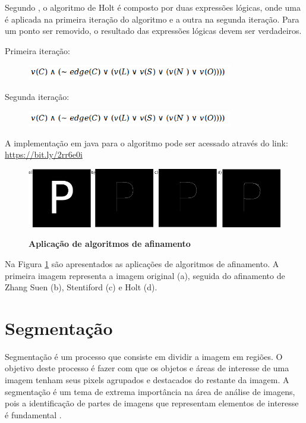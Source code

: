 \documentclass[
	12pt,				%
	oneside,			%
	a4paper,			%
	english,			%
	french,				%
	spanish,			%
	brazil,				%
	]{abntex2}
\begin{document}
Segundo \citet{guilherme:2007}, o algoritmo de Holt é composto por duas expressões lógicas, onde uma é aplicada na primeira iteração do algoritmo e a outra na segunda iteração. Para um ponto ser removido, o resultado das expressões lógicas devem ser verdadeiros.

Primeira iteração: 
\begin{figure}[ht]
\centering
\includegraphics[width=0.8\textwidth]{imagens/holt_formula1.png}
\end{figure}

Segunda iteração:
\begin{figure}[ht]
\centering
\includegraphics[width=0.8\textwidth]{imagens/holt_formula1.png}
\end{figure}

A implementação em java para o algoritmo pode ser acessado através do link: \url{https://bit.ly/2rr6e0i} 

\begin{figure}[ht]
\centering
\caption{\textbf{Aplicação de algoritmos de afinamento}}
\includegraphics[width=1\textwidth]{imagens/esqueletizacao.png}
\sourceAuthor
\label{fig:esqueletizacao}
\end{figure}

Na Figura \ref{fig:esqueletizacao} são apresentados as aplicações de algoritmos de afinamento. A primeira imagem representa a imagem original (a), seguida do afinamento de Zhang Suen (b), Stentiford (c) e Holt (d). 
   
\section{Segmentação}  

Segmentação é um processo que consiste em dividir a imagem em regiões. O objetivo deste processo é fazer com que os objetos e áreas de interesse de uma imagem tenham seus pixels agrupados e destacados do restante da imagem. A segmentação é um tema de extrema importância na área de análise de imagens, pois a identificação de partes de imagens que representam elementos de interesse é fundamental \cite{conciAzevedoLeta:2008}.  
\end{document}
